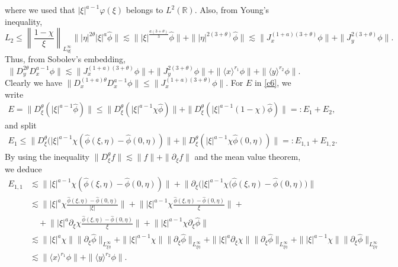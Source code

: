 \documentclass[reqno]{amsart}
\newcommand{\ha}{\hat{\phi}}
\newcommand{\lanx}{\langle x \rangle}
\newcommand{\lany}{\langle y \rangle}
\newcommand{\R}{\mathbb R}
\newcommand{\p}{\partial}
\numberwithin{equation}{section}
\begin{document}
where we used that $|\xi|^{a-1}\varphi(\xi)$ belongs to $L^2(\R)$. Also, from Young's inequality,
$$
L_2\leq \left\|\frac{1-\chi}{\xi} \right\|_{L^\infty_{\eta \xi}}\||\eta|^{2\theta}|\xi|^{a}\hat{\phi}\|\lesssim  \||\xi|^{\frac{a(3+\theta)}{3}}\hat{\phi}\|+\||\eta|^{2(3+\theta)}\hat{\phi}\|\lesssim \|J_x^{(1+a)(3+\theta)}\phi\|+\|J_y^{2(3+\theta)}\phi\|.
$$
Thus, from Sobolev's embedding,
\begin{equation*}
\|D_y^{2\theta}D^{a-1}_x\phi\|\lesssim\|J_x^{(1+a)(3+\theta)}\phi\|+\|J_y^{2(3+\theta)}\phi\|+\|\lanx^{r_1}\phi\|+\|\lany^{r_2}\phi\|.
\end{equation*}
Clearly we have $\|D^{(1+a)\theta}_xD^{a-1}_x\phi\|\leq \|J_x^{(1+a)(3+\theta)}\phi\|$. For $E$ in \eqref{c6}, we write
\begin{equation}
\begin{split}\label{c6M}
E=\|D^{\theta}_\xi (|\xi|^{a-1}\hat{\phi})\|
\leq \|D^{\theta}_\xi (|\xi|^{a-1}\chi\hat{\phi})\|+\|D^{\theta}_\xi (|\xi|^{a-1} (1-\chi)\hat{\phi})\|
=: E_1+E_2,
\end{split}
\end{equation}
and split
\begin{equation*}
\begin{split}
E_1 \leq \|D^{\theta}_\xi (|\xi|^{a-1}\chi (\hat{\phi}(\xi,\eta)-\ha(0,\eta))\|+\|D^{\theta}_\xi (|\xi|^{a-1}\chi\hat{\phi}(0,\eta))\|
=: E_{1,1}+E_{1,2}.
\end{split}
\end{equation*}
By using the inequality $\|D_\xi^\theta f\|\lesssim \|f\|+\|\partial_{\xi}f\|$ and the mean value theorem, we deduce
\begin{equation*}
\begin{split}
E_{1,1} & \lesssim  \Big\||\xi|^{a-1}\chi (\hat{\phi}(\xi,\eta)-\ha(0,\eta))\Big\|+\Big\|\p_\xi \big(|\xi|^{a-1}\chi (\hat{\phi}(\xi,\eta)-\ha(0,\eta)\big)\Big\|\\
&\lesssim\Big\||\xi|^a \chi \frac{\hat{\phi}(\xi,\eta)-\hat{\phi}(0,\eta)}{|\xi|}\Big\|+\Big\||\xi|^{a-1} \chi \frac{\hat{\phi}(\xi,\eta)-\hat{\phi}(0,\eta)}{\xi}\Big\|+\\
&\quad+ \Big\||\xi|^a \p_\xi\chi\frac{\hat{\phi}(\xi,\eta)-\hat{\phi}(0,\eta)}{\xi}\Big\|+\Big\||\xi|^{a-1}\chi \p_\xi \ha\Big\|\\
&\lesssim \||\xi|^{a} \chi\|\|\p_\xi \ha\|_{L^\infty_{\xi \eta}}+\||\xi|^{a-1}\chi\|\|\p_\xi \ha\|_{L^\infty_{\xi \eta}}+\||\xi|^a \p_\xi \chi\|\|\p_\xi \ha\|_{L^\infty_{\xi \eta}}+\||\xi|^{a-1} \chi\|\|\p_\xi \ha\|_{L^\infty_{\xi\eta}}\\
& \lesssim \|\lanx^{r_1}\phi\|+\|\lany^{r_2}\phi\|.
\end{split}
\end{equation*}
\end{document}
